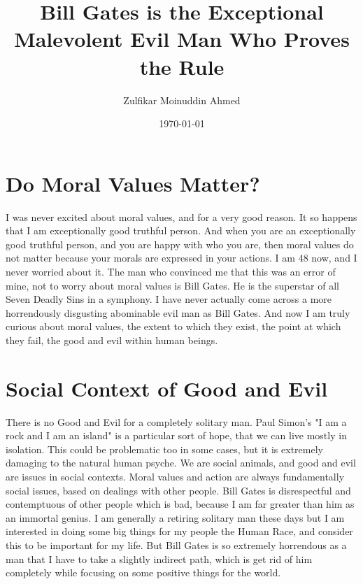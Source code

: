 \documentclass{amsart}
\title{Bill Gates is the Exceptional Malevolent Evil Man Who Proves the Rule}
\author{Zulfikar Moinuddin Ahmed}
\date{\today}
\begin{document}
\maketitle

\section{Do Moral Values Matter?}

I was never excited about moral values, and for a very good reason.  It so happens that I am exceptionally good truthful person.  And when you are an exceptionally good truthful person, and you are happy with who you are, then moral values do not matter because your morals are expressed in your actions.  I am 48 now, and I never worried about it.  The man who convinced me that this was an error of mine, not to worry about moral values is Bill Gates.  He is the superstar of all Seven Deadly Sins in a symphony.  I have never actually come across a more horrendously disgusting abominable evil man as Bill Gates.  And now I am truly curious about moral values, the extent to which they exist, the point at which they fail, the good and evil within human beings. 

\section{Social Context of Good and Evil}

There is no Good and Evil for a completely solitary man.  Paul Simon's "I am a rock and I am an island" is a particular sort of hope, that we can live mostly in isolation.  This could be problematic too in some cases, but it is extremely damaging to the natural human psyche.  We are social animals, and good and evil are issues in social contexts.  Moral values and action are always fundamentally social issues, based on dealings with other people.  Bill Gates is disrespectful and contemptuous of other people which is bad, because I am far greater than him as an immortal genius.  I am generally a retiring solitary man these days but I am interested in doing some big things for my people the Human Race, and consider this to be important for my life.  But Bill Gates is so extremely horrendous as a man that I have to take a slightly indirect path, which is get rid of him completely while focusing on some positive things for the world.
\end{document}
